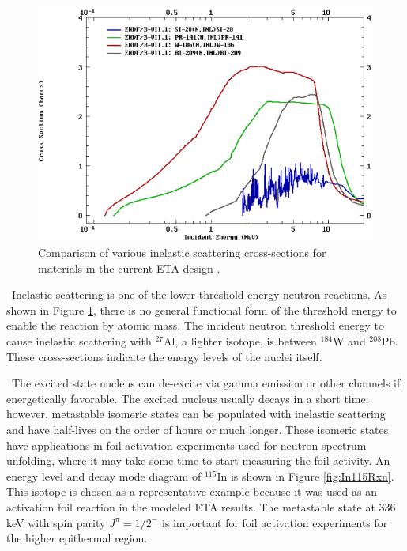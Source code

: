 \begin{figure}[ht]
	\includegraphics[width=\linewidth]{Figures/Chapter2/inelastic.png}
	\caption[Comparison of various inelastic scattering cross-sections for materials in the current ETA design.]{Comparison of various inelastic scattering cross-sections for materials in the current ETA design \cite{ENDF}.}
	\label{fig:inelastic}
\end{figure}

\ Inelastic scattering is one of the lower threshold energy neutron reactions.
As shown in Figure \ref{fig:inelastic}, there is no general functional form of the threshold energy to enable the reaction by atomic mass. 
The incident neutron threshold energy to cause inelastic scattering with $^{27}$Al, a lighter isotope, is between $^{184}$W and $^{208}$Pb. 
These cross-sections indicate the energy levels of the nuclei itself. 

\ The excited state nucleus can de-excite via gamma emission or other channels if energetically favorable. 
The excited nucleus usually decays in a short time; however, metastable isomeric states can be populated with inelastic scattering and have half-lives on the order of hours or much longer\cite{Krane}. 
These isomeric states have applications in foil activation experiments used for neutron spectrum unfolding, where it may take some time to start measuring the foil activity. 
An energy level and decay mode diagram of $^{115}$In is shown in Figure \ref{fig:In115Rxn}. This isotope is chosen as a representative example because it was used as an activation foil reaction in the modeled ETA results.
The metastable state at 336 keV with spin parity $J^{\pi} = 1/2^{-}$ is important for foil activation experiments for the higher epithermal region.

